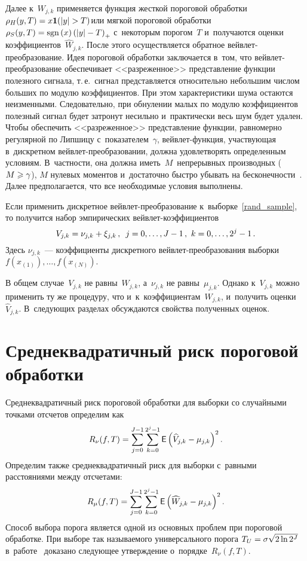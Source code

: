 \begin{multicols}{2}
Далее к~$W_{j,k}$ применяется функция жесткой пороговой обработки 
$\rho_{H}(y,T)\hm=x\mathbf{1}(\abs{y}\hm>T)$\linebreak или мягкой пороговой обработки 
$\rho_{S}(y,T)\hm=\mathrm{sgn}\,(x)\left(\abs{y}\hm-T\right)_{+}$ 
с~некоторым порогом~$T$ и~получаются оценки коэффициентов~$\widehat{W}_{j,k}$. 
После этого осуществляется обратное вейв\-лет-пре\-обра\-зо\-ва\-ние. 
Идея пороговой обработки заключается в~том, что вейв\-лет-пре\-обра\-зо\-ва\-ние 
обеспечивает <<разреженное>> пред\-став\-ле\-ние функции полезного сигнала, т.\,е.\
сигнал пред\-став\-ля\-ет\-ся относительно небольшим числом больших по модулю коэффициентов. 
При этом характеристики шума остаются неизменными. Следовательно, при обнулении малых 
по модулю коэффициентов полезный сигнал будет затронут несильно и~практически весь 
шум будет удален. Чтобы обеспечить <<разреженное>> пред\-став\-ле\-ние функции, равномерно 
регулярной по Липшицу с~показателем~$\gamma$, вейв\-лет-функ\-ция, 
участвующая в~дискретном вейв\-лет-пре\-обра\-зо\-ва\-нии, 
должна удовлетворять определенным условиям. В~част\-ности, она должна иметь~$M$~непрерывных 
производных ($M\hm\geqslant\gamma$), $M$ нулевых моментов 
и~достаточно быст\-ро убывать на бес\-ко\-неч\-ности~\cite{Mall99}. Далее предполагается, 
что все необходимые условия выполнены.

Если применить дискретное вейв\-лет-пре\-обра\-зо\-ва\-ние 
к~выборке~\eqref{rand_sample}, то получится набор эмпирических вейв\-лет-ко\-эф\-фи\-ци\-ентов
$$
V_{j,k}=\nu_{j,k}+\xi_{j,k}\,,\enskip j=0,\ldots,J-1\,,\ k=0,\ldots,2^{j}-1\,.
$$
Здесь $\nu_{j,k}$~--- коэффициенты дискретного вейв\-лет-пре\-обра\-зо\-ва\-ния 
выборки $f\left(x_{(1)}\right),\ldots, f\left(x_{(N)}\right).$

В общем случае~$V_{j,k}$ не равны~$W_{j,k}$, а~$\nu_{j,k}$ не равны~$\mu_{j,k}$. 
Однако к~$V_{j,k}$ можно применить ту же процедуру, что и~к~коэффициентам~$W_{j,k}$, 
и~получить оценки~$\widehat{V}_{j,k}$. В~сле\-ду\-ющих разделах обсуждаются 
свойства полученных оценок.

\section{Среднеквадратичный риск пороговой обработки}

Среднеквадратичный риск пороговой обработки для выборки со случайными точками 
отсчетов определим как
\begin{equation}
\label{MSE_Rand}
R_{\nu}(f,T)=\sum\limits_{j=0}^{J-1}\sum\limits_{k=0}^{2^j-1}{\sf E}\left(\widehat{V}_{j,k}-\mu_{j,k}\right)^2.
\end{equation}
Определим также среднеквадратичный риск для выборки 
с~равными расстояниями между отсчетами:
\begin{equation*}%
R_{\mu}(f,T)=\sum\limits_{j=0}^{J-1}\sumk\e\left(\widehat{W}_{j,k}-\mu_{j,k}\right)^2.
\end{equation*}
Способ выбора порога является одной из основных проблем при пороговой 
обработке. При выборе так называемого универсального порога\linebreak 
$T_U\hm=\sigma\sqrt{2\ln 2^J}$ в~работе~\cite{CB99} доказано следующее утверждение 
о~порядке~$R_{\nu}(f,T)$.


\end{multicols}

